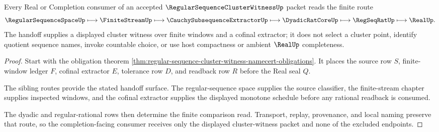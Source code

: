 \begin{theorem}
\label{thm:regular-sequence-cluster-witness-real-completion-handoff}
Every Real or Completion consumer of an accepted $\RegularSequenceClusterWitnessUp$ packet reads the finite route
$$
\RegularSequenceSpaceUp \longmapsto \FiniteStreamUp \longmapsto \CauchySubsequenceExtractorUp \longmapsto \DyadicRatCoreUp \longmapsto \RegSeqRatUp \longmapsto \RealUp .
$$
The handoff supplies a displayed cluster witness over finite windows and a cofinal extractor; it does not select a cluster point, identify quotient sequence names, invoke countable choice, or use host compactness or ambient $\RealUp$ completeness.
\end{theorem}
\begin{proof}
Start with the obligation theorem \autoref{thm:regular-sequence-cluster-witness-namecert-obligations}. It places the source row $S$, finite-window ledger $F$, cofinal extractor $E$, tolerance row $D$, and readback row $R$ before the Real seal $Q$.

The sibling routes provide the stated handoff surface. The regular-sequence space supplies the source classifier, the finite-stream chapter supplies inspected windows, and the cofinal extractor supplies the displayed monotone schedule before any rational readback is consumed.

The dyadic and regular-rational rows then determine the finite comparison read. Transport, replay, provenance, and local naming preserve that route, so the completion-facing consumer receives only the displayed cluster-witness packet and none of the excluded endpoints.
\end{proof}

